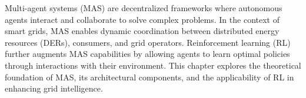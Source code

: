 Multi-agent systems (MAS) are decentralized frameworks where autonomous agents interact and collaborate to solve complex problems. 
In the context of smart grids, MAS enables dynamic coordination between distributed energy resources (DERs), consumers, and grid operators. 
Reinforcement learning (RL) further augments MAS capabilities by allowing agents to learn optimal policies through interactions with their environment. 
This chapter explores the theoretical foundation of MAS, its architectural components, and the applicability of RL in enhancing grid intelligence.
